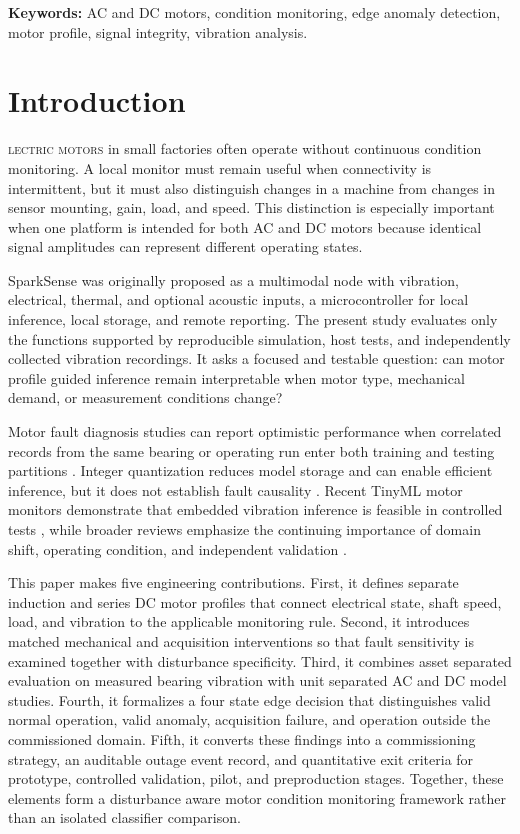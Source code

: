 \documentclass[10pt,twocolumn]{article}
\begin{document}
\vspace{2pt}
\noindent\textbf{Keywords:} AC and DC motors, condition monitoring, edge anomaly detection, motor profile, signal integrity, vibration analysis.

\section{Introduction}
\hspace{-0.08em}\textsc{lectric motors} in small factories often operate without continuous condition monitoring. A local monitor must remain useful when connectivity is intermittent, but it must also distinguish changes in a machine from changes in sensor mounting, gain, load, and speed. This distinction is especially important when one platform is intended for both AC and DC motors because identical signal amplitudes can represent different operating states.

SparkSense was originally proposed as a multimodal node with vibration, electrical, thermal, and optional acoustic inputs, a microcontroller for local inference, local storage, and remote reporting. The present study evaluates only the functions supported by reproducible simulation, host tests, and independently collected vibration recordings. It asks a focused and testable question: can motor profile guided inference remain interpretable when motor type, mechanical demand, or measurement conditions change?

Motor fault diagnosis studies can report optimistic performance when correlated records from the same bearing or operating run enter both training and testing partitions \cite{wheat2024}. Integer quantization reduces model storage and can enable efficient inference, but it does not establish fault causality \cite{jacob2018}. Recent TinyML motor monitors demonstrate that embedded vibration inference is feasible in controlled tests \cite{arciniegas2025}, while broader reviews emphasize the continuing importance of domain shift, operating condition, and independent validation \cite{lei2020}.

This paper makes five engineering contributions. First, it defines separate induction and series DC motor profiles that connect electrical state, shaft speed, load, and vibration to the applicable monitoring rule. Second, it introduces matched mechanical and acquisition interventions so that fault sensitivity is examined together with disturbance specificity. Third, it combines asset separated evaluation on measured bearing vibration with unit separated AC and DC model studies. Fourth, it formalizes a four state edge decision that distinguishes valid normal operation, valid anomaly, acquisition failure, and operation outside the commissioned domain. Fifth, it converts these findings into a commissioning strategy, an auditable outage event record, and quantitative exit criteria for prototype, controlled validation, pilot, and preproduction stages. Together, these elements form a disturbance aware motor condition monitoring framework rather than an isolated classifier comparison.
\end{document}
